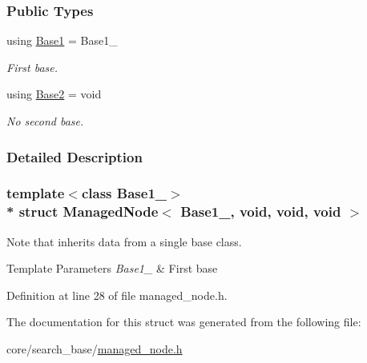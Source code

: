 \subsubsection*{Public Types}
\begin{DoxyCompactItemize}
\item 
using \hyperlink{structManagedNode_3_01Base1___00_01void_00_01void_00_01void_01_4_a91b79a8cf8fc8306ad7d0998c2e8fdf5}{Base1} = Base1\+\_\+\hypertarget{structManagedNode_3_01Base1___00_01void_00_01void_00_01void_01_4_a91b79a8cf8fc8306ad7d0998c2e8fdf5}{}\label{structManagedNode_3_01Base1___00_01void_00_01void_00_01void_01_4_a91b79a8cf8fc8306ad7d0998c2e8fdf5}

\begin{DoxyCompactList}\small\item\em First base. \end{DoxyCompactList}\item 
using \hyperlink{structManagedNode_3_01Base1___00_01void_00_01void_00_01void_01_4_ae16d4c0309fe3119f1fc9a46dd56459e}{Base2} = void\hypertarget{structManagedNode_3_01Base1___00_01void_00_01void_00_01void_01_4_ae16d4c0309fe3119f1fc9a46dd56459e}{}\label{structManagedNode_3_01Base1___00_01void_00_01void_00_01void_01_4_ae16d4c0309fe3119f1fc9a46dd56459e}

\begin{DoxyCompactList}\small\item\em No second base. \end{DoxyCompactList}\end{DoxyCompactItemize}


\subsubsection{Detailed Description}
\subsubsection*{template$<$class Base1\+\_\+$>$\\*
struct Managed\+Node$<$ Base1\+\_\+, void, void, void $>$}

Note that inherits data from a single base class. 


\begin{DoxyTemplParams}{Template Parameters}
{\em Base1\+\_\+} & First base \\
\hline
\end{DoxyTemplParams}


Definition at line 28 of file managed\+\_\+node.\+h.



The documentation for this struct was generated from the following file\+:\begin{DoxyCompactItemize}
\item 
core/search\+\_\+base/\hyperlink{managed__node_8h}{managed\+\_\+node.\+h}\end{DoxyCompactItemize}
